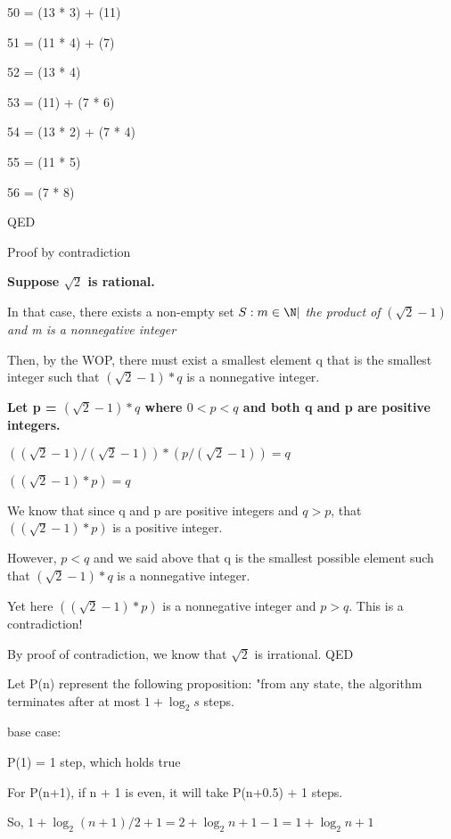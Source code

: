 \documentclass{6042}
\begin{document}
50 = (13 * 3) + (11)

51 = (11 * 4) + (7)

52 = (13 * 4)

53 = (11) + (7 * 6)

54 = (13 * 2) + (7 * 4)

55 = (11 * 5)

56 = (7 * 8)

QED




Proof by contradiction

\textbf{Suppose $\sqrt{2}$ is rational.} 

In that case, there exists a non-empty set $S:{m \in{\N}} |$
\textit{the product of} $(\sqrt{2} - 1)$ \textit{and m is a nonnegative integer}

Then, by the WOP, there must exist a smallest element q that is the smallest integer such that $(\sqrt{2} - 1)*q$ is a nonnegative integer.

\textbf{Let p =  $(\sqrt{2} - 1)*q$ where $0 < p < q$ and both q and p are positive integers.}

$((\sqrt{2} - 1)/(\sqrt{2} - 1)) * (p/(\sqrt{2} - 1)) = q$

$((\sqrt{2} - 1)*p) = q$

We know that since q and p are positive integers and $q > p$, that $((\sqrt{2} - 1)*p)$ is a positive integer.

However, $p < q$ and we said above that q is the smallest possible element such that $(\sqrt{2} - 1) * q$ is a nonnegative integer.

Yet here $((\sqrt{2} - 1)*p)$ is a nonnegative integer and $p > q$. This is a contradiction!

By proof of contradiction, we know that $\sqrt{2}$ is irrational. QED





Let P(n) represent the following proposition: "from any state, the algorithm terminates after at most $1 + \log_2s$ steps.

base case:

P(1) = 1 step, which holds true

For P(n+1), if n + 1 is even, it will take P(n+0.5) + 1 steps.

So, $1 + \log_2{(n+1)/2} + 1 = 2 + \log_2{n+1} -1 = 1 + \log_2{n+1}$
\end{document}
